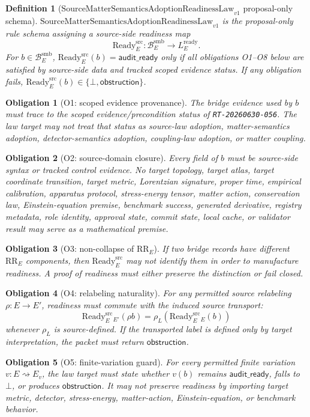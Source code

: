 \documentclass[11pt]{article}
\newcommand{\SMSAR}{\mathrm{SourceMatterSemanticsAdoptionReadinessLaw}_{v1}}
\newcommand{\BridgeDom}{\mathcal B^{\mathrm{smb}}_E}
\newcommand{\Ready}{\mathrm{Ready}^{\mathrm{src}}_E}
\newcommand{\AuditReady}{\mathsf{audit\_ready}}
\newcommand{\Obstruction}{\mathsf{obstruction}}
\newcommand{\Bottom}{\bot}
\newtheorem{definition}{Definition}
\newtheorem{obligation}{Obligation}
\begin{document}
\begin{definition}[\(\SMSAR\) proposal-only schema]
\(\SMSAR\) is the proposal-only rule schema assigning a source-side readiness
map
\[
  \Ready:\BridgeDom\to L_E^{\mathrm{ready}}.
\]
For \(b\in\BridgeDom\), \(\Ready(b)=\AuditReady\) only if all obligations
O1--O8 below are satisfied by source-side data and tracked scoped evidence
status. If any obligation fails, \(\Ready(b)\in\{\Bottom,\Obstruction\}\).
\end{definition}

\begin{obligation}[O1: scoped evidence provenance]
The bridge evidence used by \(b\) must trace to the scoped
evidence/precondition status of \texttt{RT-20260630-056}. The law target may
not treat that status as source-law adoption, matter-semantics adoption,
detector-semantics adoption, coupling-law adoption, or matter coupling.
\end{obligation}

\begin{obligation}[O2: source-domain closure]
Every field of \(b\) must be source-side syntax or tracked control evidence.
No target topology, target atlas, target coordinate transition, target metric,
Lorentzian signature, proper time, empirical calibration, apparatus protocol,
stress-energy tensor, matter action, conservation law, Einstein-equation
premise, benchmark success, generated derivative, registry metadata, role
identity, approval state, commit state, local cache, or validator result may
serve as a mathematical premise.
\end{obligation}

\begin{obligation}[O3: non-collapse of \(\mathrm{RR}_E\)]
If two bridge records have different \(\mathrm{RR}_E\) components, then
\(\Ready\) may not identify them in order to manufacture readiness. A proof
of readiness must either preserve the distinction or fail closed.
\end{obligation}

\begin{obligation}[O4: relabeling naturality]
For any permitted source relabeling \(\rho:E\to E'\), readiness must commute
with the induced source transport:
\[
  \Ready_{E'}(\rho b)=\rho_L(\Ready_E(b))
\]
whenever \(\rho_L\) is source-defined. If the transported label is defined
only by target interpretation, the packet must return \(\Obstruction\).
\end{obligation}

\begin{obligation}[O5: finite-variation guard]
For every permitted finite variation \(v:E\rightsquigarrow E_v\), the law
target must state whether \(v(b)\) remains \(\AuditReady\), falls to
\(\Bottom\), or produces \(\Obstruction\). It may not preserve readiness by
importing target metric, detector, stress-energy, matter-action,
Einstein-equation, or benchmark behavior.
\end{obligation}
\end{document}
